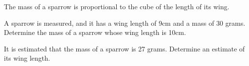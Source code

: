\begin{problem}
\clearpage

\item The mass of a sparrow is proportional to the cube of the length of its wing.
  \begin{subproblem}
    \item \label{sparrowWingArea} A sparrow is measured, and it has a wing length of 9cm and a mass of 30 grams.
    Determine the mass of a sparrow whose wing length is 10cm.
    \vfill

    \item \label{sparrowMass} It is estimated that the mass of a sparrow is 27 grams. Determine an estimate
    of its wing length.
    \vfill
  \end{subproblem}



\end{problem}

\postClass

